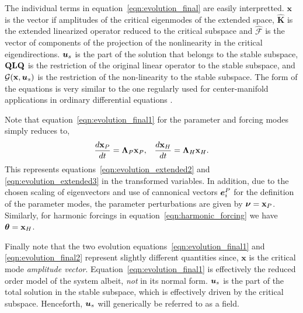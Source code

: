  The individual terms in equation~\eqref{eqn:evolution_final} are easily interpretted. $\mathbf{x}$ is the vector if amplitudes of the critical eigenmodes of the extended space, $\mathbf{\widehat{K}}$ is the extended linearized operator reduced to the critical subspace and $\mathcal{\widehat{F}}$ is the vector of components of the projection of the nonlinearity in the critical eigendirections. $\boldsymbol{u}_{s}$ is the part of the solution that belongs to the stable subspace, $\mathbf{Q}\mathbf{L}\mathbf{Q}$ is the restriction of the original linear operator to the stable subspace, and $\mathcal{G}(\mathbf{x},\boldsymbol{u}_{s})$ is the restriction of the non-linearity to the stable subspace. The form of the equations is very similar to the one regularly used for center-manifold applications in ordinary differential equations \citep{guckenheimer83,wiggins03}. 
 
 Note that equation~\eqref{eqn:evolution_final1} for the parameter and forcing modes simply reduces to,
 \begin{align} 	
 	\dfrac{d \mathbf{x}_{P}}{d t} = \mathbf{\Lambda}_{P}\mathbf{x}_{P}, && 	\dfrac{d \mathbf{x}_{H}}{d t} = \mathbf{\Lambda}_{H}\mathbf{x}_{H}. \nonumber
 \end{align}
This represents equations~\eqref{eqn:evolution_extended2} and \eqref{eqn:evolution_extended3} in the transformed variables. In addition, due to the chosen scaling of eigenvectors and use of cannonical vectors $\boldsymbol{e}^{P}_{i}$ for the definition of the parameter modes, the parameter perturbations are given by $\boldsymbol{\nu} = \mathbf{x}_{P}$. Similarly, for harmonic forcings in equation~\eqref{eqn:harmonic_forcing} we have $\boldsymbol{\theta} = \mathbf{x}_{H}$. 

Finally note that the two evolution equations~\eqref{eqn:evolution_final1} and \eqref{eqn:evolution_final2} represent slightly different quantities since, $\mathbf{x}$ is the critical mode \emph{amplitude vector}. Equation~\eqref{eqn:evolution_final1} is effectively the reduced order model of the system albeit, \emph{not} in its normal form. $\boldsymbol{u}_{s}$ is the part of the total solution in the stable subspace, which is effectively driven by the critical subspace. Henceforth, $\boldsymbol{u}_{s}$ will generically be referred to as a field. 

